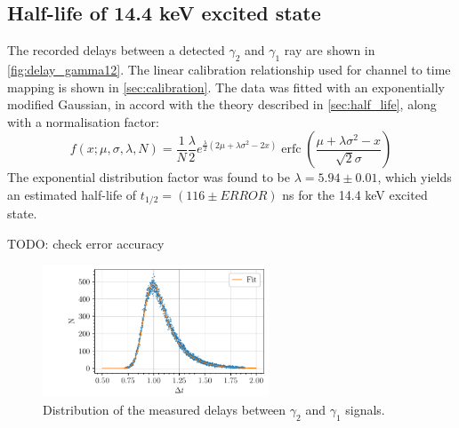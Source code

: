 \subsection{Half-life of 14.4 keV excited state}

The recorded delays between a detected \(\gamma_2\) and \(\gamma_1\) ray are shown in \autoref{fig:delay_gamma12}. The linear calibration relationship used for channel to time mapping is shown in \autoref{sec:calibration}. The data was fitted with an exponentially modified Gaussian, in accord with the theory described in \autoref{sec:half_life}, along with a normalisation factor:
\begin{equation}
    f(x;\mu,\sigma,\lambda, N) = \frac{1}{N} \frac{\lambda}{2} e^{\frac{\lambda}{2} (2 \mu + \lambda \sigma^2 - 2 x)}
             \operatorname{erfc} \left(\frac{\mu + \lambda \sigma^2 - x}{ \sqrt{2} \sigma}\right)
\end{equation}
The exponential distribution factor was found to be \(\lambda = 5.94 \pm 0.01\), which yields an estimated half-life of \(t_{1/2} = (116 \pm ERROR)\) ns for the 14.4 keV excited state.

TODO: check error accuracy

\begin{figure}[h]
    \centering
    \includegraphics[width=0.6\textwidth]{figures/co57_halflife.pdf}    
    \caption{Distribution of the measured delays between \(\gamma_2\) and \(\gamma_1\) signals.}
    \label{fig:delay_gamma12}
\end{figure}

